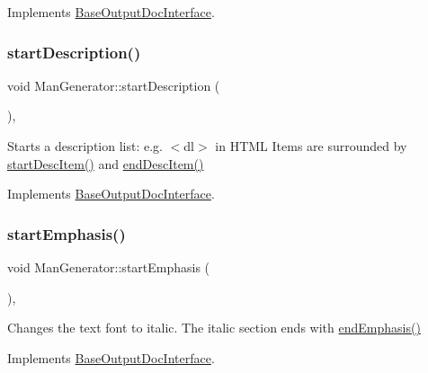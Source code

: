Implements \mbox{\hyperlink{class_base_output_doc_interface_a5d1cc59d94c3f529c90e0a06704be181}{Base\+Output\+Doc\+Interface}}.

\mbox{\label{class_man_generator_a40c97f2dcd8827c13a9d1eedb96701b5}} 
\subsubsection{\texorpdfstring{startDescription()}{startDescription()}}
{\footnotesize\ttfamily void Man\+Generator\+::start\+Description (\begin{DoxyParamCaption}{ }\end{DoxyParamCaption})\hspace{0.3cm}{\ttfamily [inline]}, {\ttfamily [virtual]}}

Starts a description list\+: e.\+g. {\ttfamily $<$dl$>$} in H\+T\+ML Items are surrounded by \mbox{\hyperlink{class_man_generator_a3230aa59d50e8bdbbfb94e56bd956f56}{start\+Desc\+Item()}} and \mbox{\hyperlink{class_man_generator_ab86f06d399e075e2b6855319bf26e1ec}{end\+Desc\+Item()}} 

Implements \mbox{\hyperlink{class_base_output_doc_interface_ac9c801c3ad0b50e3e69be184b50c2fef}{Base\+Output\+Doc\+Interface}}.

\mbox{\label{class_man_generator_a8a88956b0c96590290287835934344b9}} 
\subsubsection{\texorpdfstring{startEmphasis()}{startEmphasis()}}
{\footnotesize\ttfamily void Man\+Generator\+::start\+Emphasis (\begin{DoxyParamCaption}{ }\end{DoxyParamCaption})\hspace{0.3cm}{\ttfamily [inline]}, {\ttfamily [virtual]}}

Changes the text font to italic. The italic section ends with \mbox{\hyperlink{class_man_generator_a3e158ae587148e66ad6f3d4df509ca35}{end\+Emphasis()}} 

Implements \mbox{\hyperlink{class_base_output_doc_interface_a21debc3a6c4c58791a41e715dc78f4ab}{Base\+Output\+Doc\+Interface}}.

